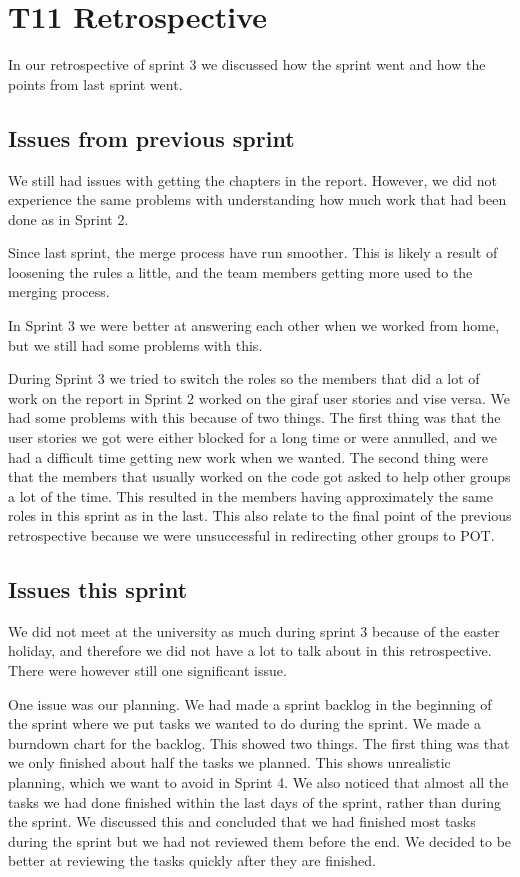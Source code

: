 \section{\gls{T11} Retrospective}

In our retrospective of sprint 3 we discussed how the sprint went and how the points from last sprint went.

\subsection{Issues from previous sprint}

We still had issues with getting the chapters in the report. However, we did not experience the same problems with understanding how much work that had been done as in Sprint 2.

Since last sprint, the merge process have run smoother. This is likely a result of loosening the rules a little, and the team members getting more used to the merging process.

In Sprint 3 we were better at answering each other when we worked from home, but we still had some problems with this.

During Sprint 3 we tried to switch the roles so the members that did a lot of work on the report in Sprint 2 worked on the \gls{giraf} user stories and vise versa. We had some problems with this because of two things. The first thing was that the user stories we got were either blocked for a long time or were annulled, and we had a difficult time getting new work when we wanted. The second thing were that the members that usually worked on the code got asked to help other groups a lot of the time. This resulted in the members having approximately the same roles in this sprint as in the last. This also relate to the final point of the previous retrospective because we were unsuccessful in redirecting other groups to \gls{POT}.

\subsection{Issues this sprint}

We did not meet at the university as much during sprint 3 because of the easter holiday, and therefore we did not have a lot to talk about in this retrospective. There were however still one significant issue.

One issue was our planning. We had made a sprint backlog in the beginning of the sprint where we put tasks we wanted to do during the sprint. We made a burndown chart for the backlog. This showed two things. The first thing was that we only finished about half the tasks we planned. This shows unrealistic planning, which we want to avoid in Sprint 4. We also noticed that almost all the tasks we had done finished within the last days of the sprint, rather than during the sprint. We discussed this and concluded that we had finished most tasks during the sprint but we had not reviewed them before the end. We decided to be better at reviewing the tasks quickly after they are finished.

